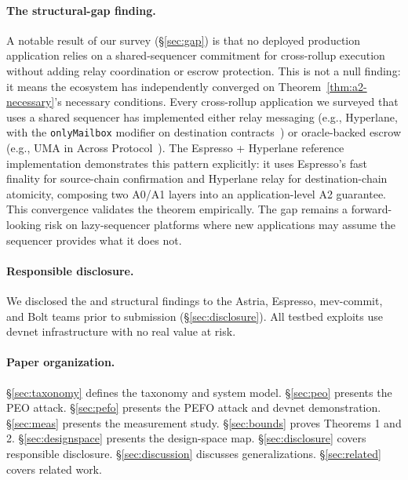\paragraph{The structural-gap finding.}
A notable result of our survey (\S\ref{sec:gap}) is that no deployed
production application relies on a shared-sequencer commitment for
cross-rollup execution without adding relay coordination or escrow
protection. This is not a null finding: it means the ecosystem has
independently converged on Theorem~\ref{thm:a2-necessary}'s necessary
conditions. Every cross-rollup application we surveyed that uses a shared
sequencer has implemented either relay messaging (e.g., Hyperlane, with the
\texttt{onlyMailbox} modifier on destination contracts~\cite{Espresso-Presto})
or oracle-backed escrow (e.g., UMA in Across Protocol~\cite{Across-Protocol}).
The Espresso + Hyperlane reference implementation demonstrates this pattern
explicitly: it uses Espresso's fast finality for source-chain confirmation
and Hyperlane relay for destination-chain atomicity, composing two A0/A1
layers into an application-level A2 guarantee. This convergence validates
the theorem empirically. The gap remains a forward-looking risk on
lazy-sequencer platforms where new applications may assume the sequencer
provides what it does not.

\paragraph{Responsible disclosure.}
We disclosed the \PEO{} and \PEFO{} structural findings to the Astria,
Espresso, mev-commit, and Bolt teams prior to submission
(\S\ref{sec:disclosure}). All testbed exploits use devnet
infrastructure with no real value at risk.

\paragraph{Paper organization.}
§\ref{sec:taxonomy} defines the taxonomy and system model.
§\ref{sec:peo} presents the PEO attack.
§\ref{sec:pefo} presents the PEFO attack and devnet demonstration.
§\ref{sec:meas} presents the measurement study.
§\ref{sec:bounds} proves Theorems 1 and 2.
§\ref{sec:designspace} presents the design-space map.
§\ref{sec:disclosure} covers responsible disclosure.
§\ref{sec:discussion} discusses generalizations.
§\ref{sec:related} covers related work.
